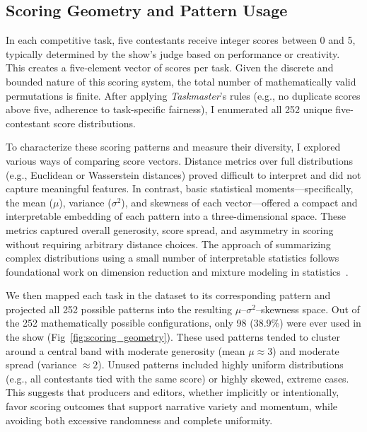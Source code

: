 \documentclass[10pt,letterpaper]{article}
\begin{document}
\subsection*{Scoring Geometry and Pattern Usage}

In each competitive task, five contestants receive integer scores between 0 and 5, typically determined by the show's judge based on performance or creativity. This creates a five-element vector of scores per task. Given the discrete and bounded nature of this scoring system, the total number of mathematically valid permutations is finite. After applying \textit{Taskmaster}'s rules (e.g., no duplicate scores above five, adherence to task-specific fairness), I enumerated all 252 unique five-contestant score distributions.

To characterize these scoring patterns and measure their diversity, I explored various ways of comparing score vectors. Distance metrics over full distributions (e.g., Euclidean or Wasserstein distances) proved difficult to interpret and did not capture meaningful features. In contrast, basic statistical moments—specifically, the mean ($\mu$), variance ($\sigma^2$), and skewness of each vector—offered a compact and interpretable embedding of each pattern into a three-dimensional space. These metrics captured overall generosity, score spread, and asymmetry in scoring without requiring arbitrary distance choices. The approach of summarizing complex distributions using a small number of interpretable statistics follows foundational work on dimension reduction and mixture modeling in statistics~\cite{Pearson1901,Hotelling1933,McLachlan2000}.

We then mapped each task in the dataset to its corresponding pattern and projected all 252 possible patterns into the resulting $\mu$–$\sigma^2$–skewness space. Out of the 252 mathematically possible configurations, only 98 (38.9\%) were ever used in the show (Fig~\ref{fig:scoring_geometry}). These used patterns tended to cluster around a central band with moderate generosity (mean $\mu \approx 3$) and moderate spread (variance $\approx 2$). Unused patterns included highly uniform distributions (e.g., all contestants tied with the same score) or highly skewed, extreme cases. This suggests that producers and editors, whether implicitly or intentionally, favor scoring outcomes that support narrative variety and momentum, while avoiding both excessive randomness and complete uniformity.
\end{document}

